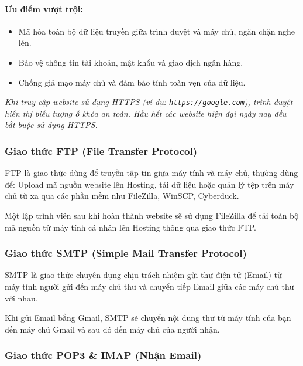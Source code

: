 \documentclass[11pt,oneside]{book}
\newcommand{\codeinline}[1]{\textcolor{accentOrange}{\texttt{#1}}}
\begin{document}
\paragraph{Ưu điểm vượt trội:}
\begin{itemize}[leftmargin=1.8em, itemsep=2pt, parsep=0pt]
    \item Mã hóa toàn bộ dữ liệu truyền giữa trình duyệt và máy chủ, ngăn chặn nghe lén.
    \item Bảo vệ thông tin tài khoản, mật khẩu và giao dịch ngân hàng.
    \item Chống giả mạo máy chủ và đảm bảo tính toàn vẹn của dữ liệu.
\end{itemize}
\textit{Khi truy cập website sử dụng HTTPS (ví dụ: \codeinline{https://google.com}), trình duyệt hiển thị biểu tượng ổ khóa an toàn. Hầu hết các website hiện đại ngày nay đều bắt buộc sử dụng HTTPS.}

\subsubsection{Giao thức FTP (File Transfer Protocol)}

FTP là giao thức dùng để truyền tập tin giữa máy tính và máy chủ, thường dùng để: Upload mã nguồn website lên Hosting, tải dữ liệu hoặc quản lý tệp trên máy chủ từ xa qua các phần mềm như FileZilla, WinSCP, Cyberduck.

\begin{tipBox}
Một lập trình viên sau khi hoàn thành website sẽ sử dụng FileZilla để tải toàn bộ mã nguồn từ máy tính cá nhân lên Hosting thông qua giao thức FTP.
\end{tipBox}

\subsubsection{Giao thức SMTP (Simple Mail Transfer Protocol)}

SMTP là giao thức chuyên dụng chịu trách nhiệm gửi thư điện tử (Email) từ máy tính người gửi đến máy chủ thư và chuyển tiếp Email giữa các máy chủ thư với nhau.

\begin{noteBox}[Ví dụ về SMTP]
Khi gửi Email bằng Gmail, SMTP sẽ chuyển nội dung thư từ máy tính của bạn đến máy chủ Gmail và sau đó đến máy chủ của người nhận.
\end{noteBox}

\subsubsection{Giao thức POP3 \& IMAP (Nhận Email)}
\end{document}
